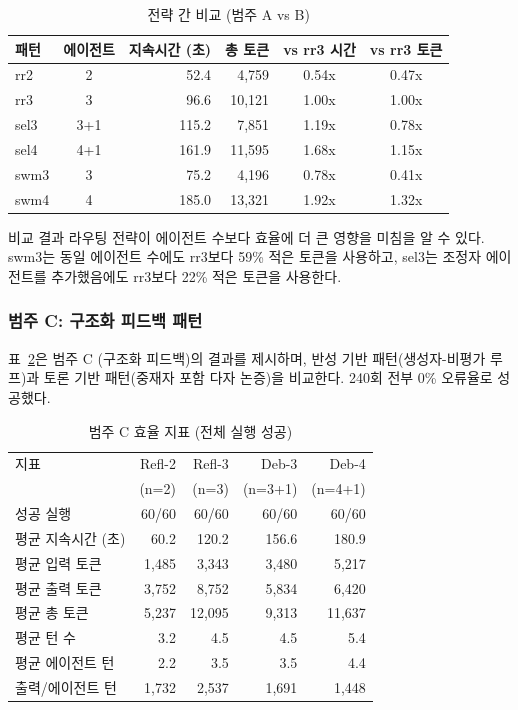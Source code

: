 \documentclass[a4paper,11pt]{article}
\begin{document}
\begin{table}[H]
\centering
\caption{전략 간 비교 (범주 A vs B)}
\label{tab:cross-ab}
{\small
\begin{tabular}{lcrrcc}
\toprule
패턴 & 에이전트 & 지속시간 (초) & 총 토큰 & vs rr3 시간 & vs rr3 토큰 \\
\midrule
rr2  & 2   & 52.4  & 4,759  & 0.54x & 0.47x \\
rr3  & 3   & 96.6  & 10,121 & 1.00x & 1.00x \\
sel3 & 3+1 & 115.2 & 7,851  & 1.19x & 0.78x \\
sel4 & 4+1 & 161.9 & 11,595 & 1.68x & 1.15x \\
swm3 & 3   & 75.2  & 4,196  & 0.78x & 0.41x \\
swm4 & 4   & 185.0 & 13,321 & 1.92x & 1.32x \\
\bottomrule
\end{tabular}
}
\end{table}

비교 결과 라우팅 전략이 에이전트 수보다 효율에 더 큰 영향을 미침을 알 수 있다. swm3는 동일 에이전트 수에도 rr3보다 59\% 적은 토큰을 사용하고, sel3는 조정자 에이전트를 추가했음에도 rr3보다 22\% 적은 토큰을 사용한다.

\subsubsection{범주 C: 구조화 피드백 패턴}

표~\ref{tab:cat-c}은 범주 C (구조화 피드백)의 결과를 제시하며, 반성 기반 패턴(생성자-비평가 루프)과 토론 기반 패턴(중재자 포함 다자 논증)을 비교한다. 240회 전부 0\% 오류율로 성공했다.

\begin{table}[H]
\centering
\caption{범주 C 효율 지표 (전체 실행 성공)}
\label{tab:cat-c}
{\small
\begin{tabular}{lrrrr}
\toprule
지표 & Refl-2 & Refl-3 & Deb-3 & Deb-4 \\
    & (n=2)  & (n=3)  & (n=3+1) & (n=4+1) \\
\midrule
성공 실행       & 60/60 & 60/60 & 60/60 & 60/60 \\
평균 지속시간 (초) & 60.2 & 120.2 & 156.6 & 180.9 \\
평균 입력 토큰   & 1,485 & 3,343 & 3,480 & 5,217 \\
평균 출력 토큰   & 3,752 & 8,752 & 5,834 & 6,420 \\
평균 총 토큰     & 5,237 & 12,095 & 9,313 & 11,637 \\
평균 턴 수       & 3.2 & 4.5 & 4.5 & 5.4 \\
평균 에이전트 턴 & 2.2 & 3.5 & 3.5 & 4.4 \\
출력/에이전트 턴 & 1,732 & 2,537 & 1,691 & 1,448 \\
\bottomrule
\end{tabular}
}
\end{table}
\end{document}
